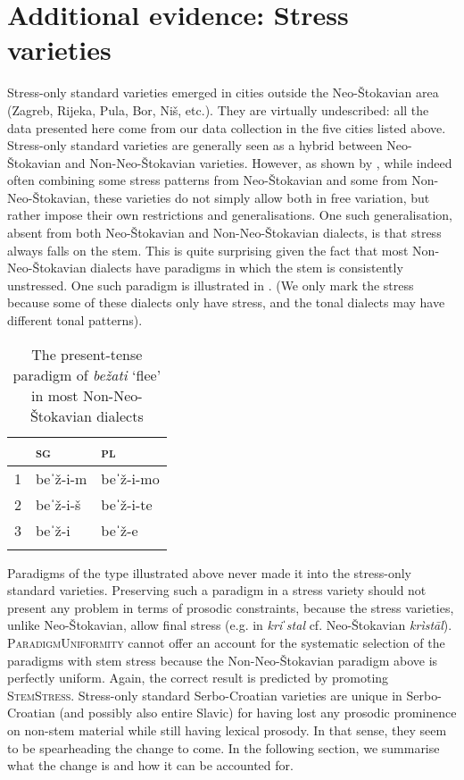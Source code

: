 \documentclass[output=paper,modfonts,nonflat
]{langsci/langscibook}
\begin{document}
\section{Additional evidence: Stress varieties} \label{sec:kager:4}
Stress-only standard varieties emerged in cities outside the Neo-Štokavian area (Zagreb, Rijeka, Pula, Bor, Niš, etc.). They are virtually undescribed: all the data presented here come from our data collection in the five cities listed above. 
Stress-only standard varieties are generally seen as a hybrid between Neo-Štokavian and Non-Neo-Štokavian varieties. However, as shown by \citet{SimonovicKager2017}, while indeed often combining some stress patterns from Neo-Štokavian and some from Non-Neo-Štokavian, these varieties do not simply allow both in free variation, but rather impose their own restrictions and generalisations. One such generalisation, absent from both Neo-Štokavian and Non-Neo-Štokavian dialects, is that stress always falls on the stem. This is quite surprising given the fact that most Non-Neo-Štokavian dialects have paradigms in which the stem is consistently unstressed. One such paradigm is illustrated in  . (We only mark the stress because some of these dialects only have stress, and the tonal dialects may have different tonal patterns).

\begin{table}
\caption{The present-tense paradigm of \textit{bežati} `flee' in most Non-Neo-Štokavian dialects}
\label{tab:kager:10}
 \begin{tabular}{ l  l  l }
  \lsptoprule
& \textsc{sg}  & \textsc{pl} \\ 
 \midrule
 1  &  beˈž-i-m  &   beˈž-i-mo \\
2  &  beˈž-i-š  & beˈž-i-te \\
3  &  beˈž-i & beˈž-e \\
  \lspbottomrule
 \end{tabular}
\end{table}

Paradigms of the type illustrated above never made it into the stress-only standard varieties. Preserving such a paradigm in a stress variety should not present any problem in terms of prosodic constraints, because the stress varieties, unlike Neo-Štokavian, allow final stress (e.g. in \textit{kriˈstal} cf. Neo-Štokavian \textit{krìstāl}). \textsc{ParadigmUniformity} cannot offer an account for the systematic selection of the paradigms with stem stress because the Non-Neo-Štokavian paradigm above is perfectly uniform. Again, the correct result is predicted by promoting \textsc{StemStress}. Stress-only standard Serbo-Croatian varieties are unique in Serbo-Croatian (and possibly also entire Slavic) for having lost any prosodic prominence on non-stem material while still having lexical prosody. In that sense, they seem to be spearheading the change to come.
In the following section, we summarise what the change is and how it can be accounted for.
\end{document}
